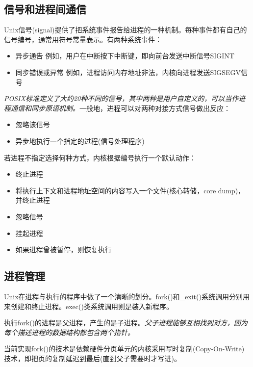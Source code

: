 \subsection{信号和进程间通信}

    Unix信号(signal)提供了把系统事件报告给进程的一种机制。每种事件都有自己的信号编号，通常用符号常量表示。有两种系统事件：

\begin{itemize}
    \item 异步通告
    \subitem 例如，用户在中断按下中断键，即向前台发送中断信号SIGINT
    \item 同步错误或异常
    \subitem 例如，进程访问内存地址非法，内核向进程发送SIGSEGV信号
\end{itemize}

    \emph{POSIX标准定义了大约20种不同的信号，其中两种是用户自定义的，可以当作进程通信和同步原语机制。}一般地，进程可以对两种对接方式信号做出反应：

\begin{itemize}
    \item 忽略该信号
    \item 异步地执行一个指定的过程(信号处理程序)
\end{itemize}

    若进程不指定选择何种方式，内核根据编号执行一个默认动作：

\begin{itemize}
    \item 终止进程
    \item 将执行上下文和进程地址空间的内容写入一个文件(核心转储，core dump)，并终止进程
    \item 忽略信号
    \item 挂起进程
    \item 如果进程曾被暂停，则恢复执行
\end{itemize}

\subsection{进程管理}

    Unix在进程与执行的程序中做了一个清晰的划分。fork()和\_exit()系统调用分别用来创建和终止进程。exec()类系统调用则是装入新程序。

    执行fork()的进程是父进程，产生的是子进程。\emph{父子进程能够互相找到对方，因为每个描述进程的数据结构都包含两个指针。}

    当前实现fork()的技术是依赖硬件分页单元的内核采用写时复制(Copy-On-Write)技术，即把页的复制延迟到最后(直到父子需要时才写进)。


